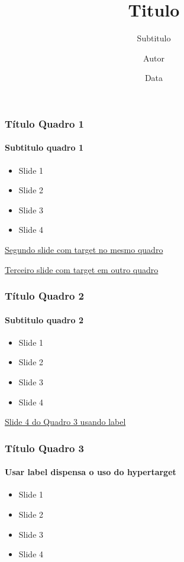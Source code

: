 \documentclass{beamer}
\title{Titulo}
\subtitle{Subtitulo}
\author[A.]{Autor}
\date{Data}
\institute[Inst.]{Intituição}
\begin{document}
\begin{frame}
	\titlepage
\end{frame}

\begin{frame}
	\frametitle{Título Quadro 1}
	\framesubtitle{Subtitulo quadro 1}
	
	\begin{itemize}
		\item<1-> Slide 1
		\item<2-> Slide 2
		\item<3-> Slide 3
		\item<4-> Slide 4
	\end{itemize}
	
	\hypertarget<2>{segundo-slide-quadro1}{}
	\hyperlink{segundo-slide-quadro1}{Segundo slide com target no mesmo quadro}
	
	\hyperlink{terceiro-slide-quadro2}{Terceiro slide com target em outro quadro}
	
\end{frame}

\begin{frame}
	\frametitle{Título Quadro 2}
	\framesubtitle{Subtitulo quadro 2}
	
	\begin{itemize}
		\item<1-> Slide 1
		\item<2-> Slide 2
		\item<3-> Slide 3
		\item<4-> Slide 4
	\end{itemize}
	
	\hypertarget<3>{terceiro-slide-quadro2}{}
	
	\hyperlink{terceiro-quadro<4>}{Slide 4 do Quadro 3 usando label}
\end{frame}

\begin{frame}[label=terceiro-quadro] 
	\frametitle{Título Quadro 3}
	\framesubtitle{Usar label dispensa o uso do hypertarget}
	
	\begin{itemize}
		\item<1-> Slide 1
		\item<2-> Slide 2
		\item<3-> Slide 3
		\item<4-> Slide 4
	\end{itemize}

\end{frame}
\end{document}
